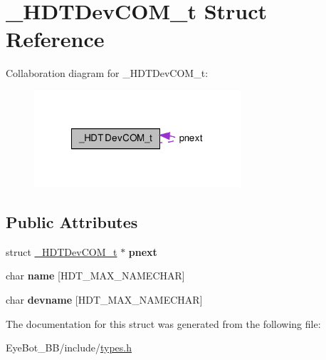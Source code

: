 \hypertarget{struct___h_d_t_dev_c_o_m__t}{\section{\-\_\-\-H\-D\-T\-Dev\-C\-O\-M\-\_\-t \-Struct \-Reference}
\label{struct___h_d_t_dev_c_o_m__t}
}


\-Collaboration diagram for \-\_\-\-H\-D\-T\-Dev\-C\-O\-M\-\_\-t\-:\nopagebreak
\begin{figure}[H]
\begin{center}
\leavevmode
\includegraphics[width=218pt]{struct___h_d_t_dev_c_o_m__t__coll__graph}
\end{center}
\end{figure}
\subsection*{\-Public \-Attributes}
\begin{DoxyCompactItemize}
\item 
\hypertarget{struct___h_d_t_dev_c_o_m__t_a32ed7a89d24e096eaba2f5fb786b3343}{struct \hyperlink{struct___h_d_t_dev_c_o_m__t}{\-\_\-\-H\-D\-T\-Dev\-C\-O\-M\-\_\-t} $\ast$ {\bfseries pnext}}\label{struct___h_d_t_dev_c_o_m__t_a32ed7a89d24e096eaba2f5fb786b3343}

\item 
\hypertarget{struct___h_d_t_dev_c_o_m__t_a01f98f53a586d027440c1fe4748e8cb0}{char {\bfseries name} \mbox{[}\-H\-D\-T\-\_\-\-M\-A\-X\-\_\-\-N\-A\-M\-E\-C\-H\-A\-R\mbox{]}}\label{struct___h_d_t_dev_c_o_m__t_a01f98f53a586d027440c1fe4748e8cb0}

\item 
\hypertarget{struct___h_d_t_dev_c_o_m__t_a0a3835e241a48ee70d2815ed0e9c644f}{char {\bfseries devname} \mbox{[}\-H\-D\-T\-\_\-\-M\-A\-X\-\_\-\-N\-A\-M\-E\-C\-H\-A\-R\mbox{]}}\label{struct___h_d_t_dev_c_o_m__t_a0a3835e241a48ee70d2815ed0e9c644f}

\end{DoxyCompactItemize}


\-The documentation for this struct was generated from the following file\-:\begin{DoxyCompactItemize}
\item 
\-Eye\-Bot\-\_\-\-B\-B/include/\hyperlink{types_8h}{types.\-h}\end{DoxyCompactItemize}
